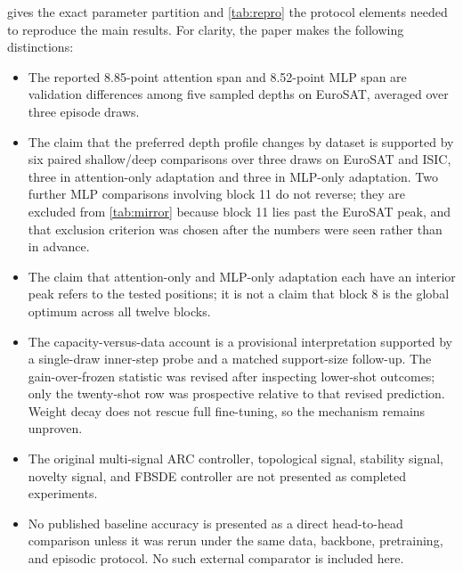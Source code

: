 \documentclass[11pt]{article}
\begin{document}
 gives the exact parameter partition and \cref{tab:repro} the protocol elements needed to reproduce the main results. For clarity, the paper makes the following distinctions:
\begin{itemize}
  \item The reported 8.85-point attention span and 8.52-point MLP span are validation differences among five sampled depths on EuroSAT, averaged over three episode draws.
  \item The claim that the preferred depth profile changes by dataset is supported by six paired shallow/deep comparisons over three draws on EuroSAT and ISIC, three in attention-only adaptation and three in MLP-only adaptation. Two further MLP comparisons involving block 11 do not reverse; they are excluded from \cref{tab:mirror} because block 11 lies past the EuroSAT peak, and that exclusion criterion was chosen after the numbers were seen rather than in advance.
  \item The claim that attention-only and MLP-only adaptation each have an interior peak refers to the tested positions; it is not a claim that block 8 is the global optimum across all twelve blocks.
  \item The capacity-versus-data account is a provisional interpretation supported by a single-draw inner-step probe and a matched support-size follow-up. The gain-over-frozen statistic was revised after inspecting lower-shot outcomes; only the twenty-shot row was prospective relative to that revised prediction. Weight decay does not rescue full fine-tuning, so the mechanism remains unproven.
  \item The original multi-signal ARC controller, topological signal, stability signal, novelty signal, and FBSDE controller are not presented as completed experiments.
  \item No published baseline accuracy is presented as a direct head-to-head comparison unless it was rerun under the same data, backbone, pretraining, and episodic protocol. No such external comparator is included here.
\end{itemize}
\end{document}
